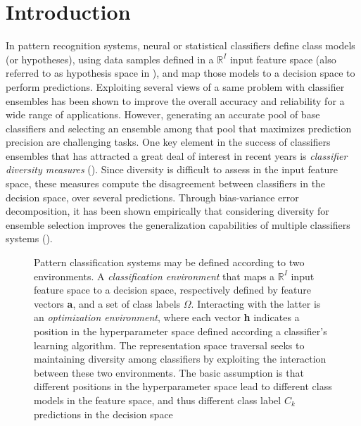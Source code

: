 \section{Introduction}

In pattern recognition systems, neural or statistical classifiers define class models (or hypotheses), using data samples defined in a $\mathbb{R}^I$ input feature space (also referred to as hypothesis space in \cite{brown05}), and map those models to a decision space to perform predictions.
Exploiting several views of a same problem with classifier ensembles has been shown to improve the overall accuracy and reliability for a wide range of applications.
However, generating an accurate pool of base classifiers and selecting an ensemble among that pool that maximizes prediction precision are challenging tasks.
One key element in the success of classifiers ensembles that has attracted a great deal of interest in recent years is \emph{classifier diversity measures} (\cite{canuto07, hadjitodorov06, kapp07, oliveira09, sirlantzis08, ulas09}).
Since diversity is difficult to assess in the input feature space, these measures compute the disagreement between classifiers in the decision space, over several predictions.
Through bias-variance error decomposition, it has been shown empirically that considering diversity for ensemble selection improves the generalization capabilities of multiple classifiers systems (\cite{brown05}).

\begin{figure*}[tb]
  \centering
  \caption{Pattern classification systems may be defined according to two environments.
A \emph{classification environment} that maps a $\mathbb{R}^I$ input feature space to a decision space, respectively defined by feature vectors \textbf{a}, and a set of class labels $\Omega$.
Interacting with the latter is an \emph{optimization environment}, where each vector \textbf{h} indicates a position in the hyperparameter space defined according a classifier's learning algorithm.
The representation space traversal seeks to maintaining diversity among classifiers by exploiting the interaction between these two environments.
The basic assumption is that different positions in the hyperparameter space lead to different class models in the feature space, and thus different class label $C_k$ predictions in the decision space}
	\label{fig:c2_environments}
\end{figure*}

